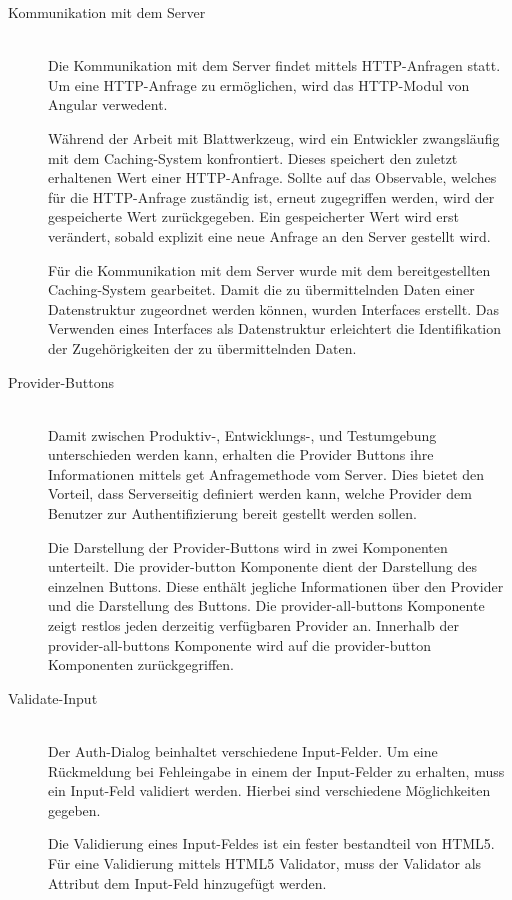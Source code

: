 \begin{description}
	\item[Kommunikation mit dem Server]\hfill\\
	Die Kommunikation mit dem Server findet mittels \gls{HTTP}-Anfragen statt. Um eine \gls{HTTP}-Anfrage zu ermöglichen, wird das \gls{HTTP}-Modul von Angular verwedent.

	Während der Arbeit mit Blattwerkzeug, wird ein Entwickler zwangsläufig mit dem Caching-System konfrontiert. Dieses speichert den zuletzt erhaltenen Wert einer \gls{HTTP}-Anfrage. Sollte auf das Observable, welches für die \gls{HTTP}-Anfrage zuständig ist, erneut zugegriffen werden, wird der gespeicherte Wert zurückgegeben. Ein gespeicherter Wert wird erst verändert, sobald explizit eine neue Anfrage an den Server gestellt wird.
	
	Für die Kommunikation mit dem Server wurde mit dem bereitgestellten Caching-System gearbeitet. Damit die zu übermittelnden Daten einer Datenstruktur zugeordnet werden können, wurden Interfaces erstellt. Das Verwenden eines Interfaces als Datenstruktur erleichtert die Identifikation der Zugehörigkeiten der zu übermittelnden Daten. 

	\item[Provider-Buttons]\hfill\\
	Damit zwischen Produktiv-, Entwicklungs-, und Testumgebung unterschieden werden kann, erhalten die Provider Buttons ihre Informationen mittels get Anfragemethode vom Server. Dies bietet den Vorteil, dass Serverseitig definiert werden kann, welche Provider dem Benutzer zur Authentifizierung bereit gestellt werden sollen.

	Die Darstellung der Provider-Buttons wird in zwei Komponenten unterteilt. Die provider-button Komponente dient der Darstellung des einzelnen Buttons. Diese enthält jegliche Informationen über den Provider und die Darstellung des Buttons. Die provider-all-buttons Komponente zeigt restlos jeden derzeitig verfügbaren Provider an. Innerhalb der provider-all-buttons Komponente wird auf die provider-button Komponenten zurückgegriffen.
	\item[Validate-Input]\hfill\\
	Der Auth-Dialog beinhaltet verschiedene Input-Felder. Um eine Rückmeldung bei Fehleingabe in einem der Input-Felder zu erhalten, muss ein Input-Feld validiert werden. Hierbei sind verschiedene Möglichkeiten gegeben.

	Die Validierung eines Input-Feldes ist ein fester bestandteil von \gls{HTML}5. Für eine Validierung mittels \gls{HTML}5 Validator, muss der Validator als Attribut dem Input-Feld hinzugefügt werden. 
	

\end{description}
